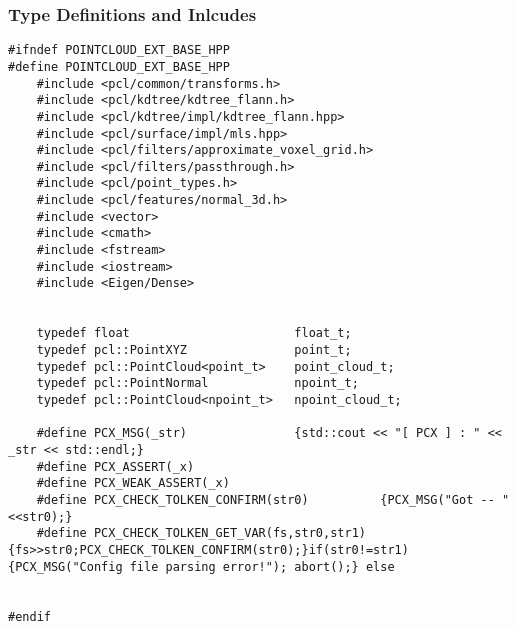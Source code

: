\subsubsection{Type Definitions and Inlcudes}
\begin{lstlisting}
#ifndef POINTCLOUD_EXT_BASE_HPP
#define POINTCLOUD_EXT_BASE_HPP
	#include <pcl/common/transforms.h>
	#include <pcl/kdtree/kdtree_flann.h>
	#include <pcl/kdtree/impl/kdtree_flann.hpp>
	#include <pcl/surface/impl/mls.hpp>
	#include <pcl/filters/approximate_voxel_grid.h>
	#include <pcl/filters/passthrough.h>
	#include <pcl/point_types.h>
	#include <pcl/features/normal_3d.h>
	#include <vector>
	#include <cmath>
	#include <fstream>
	#include <iostream>
	#include <Eigen/Dense>


	typedef float 						float_t;
	typedef pcl::PointXYZ               point_t;
	typedef pcl::PointCloud<point_t>    point_cloud_t;
	typedef pcl::PointNormal            npoint_t;
	typedef pcl::PointCloud<npoint_t>   npoint_cloud_t;

	#define PCX_MSG(_str)				{std::cout << "[ PCX ] : " << _str << std::endl;}
	#define PCX_ASSERT(_x)
	#define PCX_WEAK_ASSERT(_x)
	#define PCX_CHECK_TOLKEN_CONFIRM(str0) 			{PCX_MSG("Got -- "<<str0);}
	#define PCX_CHECK_TOLKEN_GET_VAR(fs,str0,str1) {fs>>str0;PCX_CHECK_TOLKEN_CONFIRM(str0);}if(str0!=str1){PCX_MSG("Config file parsing error!"); abort();} else


#endif
\end{lstlisting}

